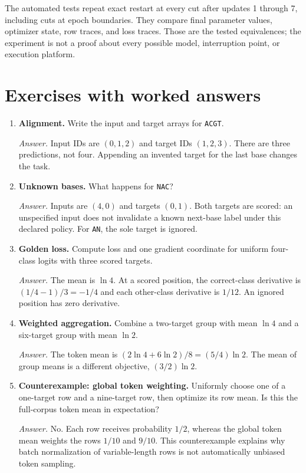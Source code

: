 The automated tests repeat exact restart at every cut after updates 1 through 7, including cuts at epoch boundaries. They compare final parameter values, optimizer state, row traces, and loss traces. Those are the tested equivalences; the experiment is not a proof about every possible model, interruption point, or execution platform.

\section{Exercises with worked answers}

\begin{enumerate}
\item \textbf{Alignment.} Write the input and target arrays for \texttt{ACGT}.\par
\textit{Answer.} Input IDs are $(0,1,2)$ and target IDs $(1,2,3)$. There are three predictions, not four. Appending an invented target for the last base changes the task.

\item \textbf{Unknown bases.} What happens for \texttt{NAC}?\par
\textit{Answer.} Inputs are $(4,0)$ and targets $(0,1)$. Both targets are scored: an unspecified input does not invalidate a known next-base label under this declared policy. For \texttt{AN}, the sole target is ignored.

\item \textbf{Golden loss.} Compute loss and one gradient coordinate for uniform four-class logits with three scored targets.\par
\textit{Answer.} The mean is $\ln4$. At a scored position, the correct-class derivative is $(1/4-1)/3=-1/4$ and each other-class derivative is $1/12$. An ignored position has zero derivative.

\item \textbf{Weighted aggregation.} Combine a two-target group with mean $\ln4$ and a six-target group with mean $\ln2$.\par
\textit{Answer.} The token mean is $(2\ln4+6\ln2)/8=(5/4)\ln2$. The mean of group means is a different objective, $(3/2)\ln2$.

\item \textbf{Counterexample: global token weighting.} Uniformly choose one of a one-target row and a nine-target row, then optimize its row mean. Is this the full-corpus token mean in expectation?\par
\textit{Answer.} No. Each row receives probability $1/2$, whereas the global token mean weights the rows $1/10$ and $9/10$. This counterexample explains why batch normalization of variable-length rows is not automatically unbiased token sampling.


\end{enumerate}
